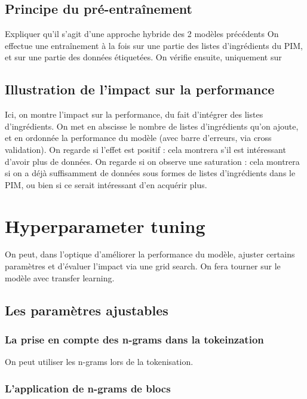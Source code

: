         \section{Principe du pré-entraînement}
        
        Expliquer qu'il s'agit d'une approche hybride des 2 modèles précédents
        On effectue une entraînement à la fois sur une partie des listes d'ingrédients du PIM, et sur une partie des données étiquetées.
        On vérifie ensuite, uniquement sur 

        \section{Illustration de l'impact sur la performance}

        Ici, on montre l'impact sur la performance, du fait d'intégrer des listes d'ingrédients.
        On met en abscisse le nombre de listes d'ingrédients qu'on ajoute, et en ordonnée la performance du modèle (avec barre d'erreurs, via cross validation).
        On regarde si l'effet est positif : cela montrera s'il est intéressant d'avoir plus de données.
        On regarde si on observe une saturation : cela montrera si on a déjà suffisamment de données sous formes de listes d'ingrédients dans le PIM, ou bien si ce serait intéressant d'en acquérir plus.

    \chapter{Hyperparameter tuning}
            
    On peut, dans l'optique d'améliorer la performance du modèle, ajuster certains paramètres et d'évaluer l'impact via une grid search.
    On fera tourner sur le modèle avec transfer learning.

        \section{Les paramètres ajustables}

            \subsection{La prise en compte des \og n-grams \fg dans la tokeinzation}

            On peut utiliser les n-grams lors de la tokenisation.

            \subsection{L'application de \og n-grams \fg de blocs}

